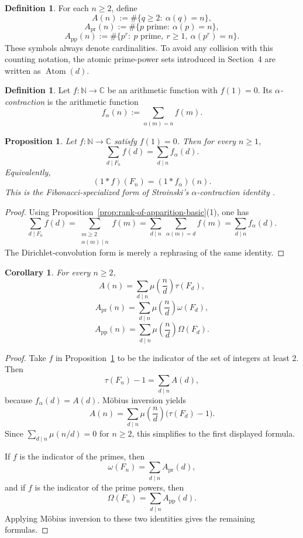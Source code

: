 \documentclass[11pt,letterpaper]{article}
\numberwithin{equation}{section}
\theoremstyle{plain}
\newtheorem{proposition}[theorem]{Proposition}
\newtheorem{corollary}[theorem]{Corollary}
\theoremstyle{definition}
\newtheorem{definition}[theorem]{Definition}
\theoremstyle{remark}
\newcommand{\NN}{\mathbb{N}}
\DeclareMathOperator{\Atom}{Atom}
\begin{document}
\begin{definition}
\label{def:birth-spectra}
For each $n\ge 2$, define
\[
A(n):=\#\{q\ge 2:\ \alpha(q)=n\},
\]
\[
A_{\mathrm{pr}}(n):=\#\{p\text{ prime}:\ \alpha(p)=n\},
\]
\[
A_{\mathrm{pp}}(n):=\#\{p^r:\ p\text{ prime},\ r\ge 1,\ \alpha(p^r)=n\}.
\]
These symbols always denote cardinalities. To avoid any collision with this
counting notation, the atomic prime-power sets introduced in Section~4 are
written as $\Atom(d)$.
\end{definition}

\begin{definition}
\label{def:alpha-contraction}
Let $f:\NN\to \mathbb{C}$ be an arithmetic function with $f(1)=0$. Its
\emph{$\alpha$-contraction} is the arithmetic function
\[
f_\alpha(n):=\sum_{\alpha(m)=n} f(m).
\]
\end{definition}

\begin{proposition}
\label{prop:stroinski-alpha-contraction}
Let $f:\NN\to\mathbb{C}$ satisfy $f(1)=0$. Then for every $n\ge 1$,
\[
\sum_{d\mid F_n} f(d)=\sum_{d\mid n} f_\alpha(d).
\]
Equivalently,
\[
(1*f)(F_n)=(1*f_\alpha)(n).
\]
This is the Fibonacci-specialized form of Stroinski's $\alpha$-contraction
identity \cite{Stroinski2016AlphaContraction}.
\end{proposition}

\begin{proof}
Using Proposition~\ref{prop:rank-of-apparition-basic}(1), one has
\[
\sum_{d\mid F_n} f(d)
=
\sum_{\substack{m\ge 2\\ \alpha(m)\mid n}} f(m)
=
\sum_{d\mid n}\ \sum_{\alpha(m)=d} f(m)
=
\sum_{d\mid n} f_\alpha(d).
\]
The Dirichlet-convolution form is merely a rephrasing of the same identity.
\end{proof}

\begin{corollary}
\label{thm:birth-spectrum-mobius}
For every $n\ge 2$,
\[
A(n)=\sum_{d\mid n}\mu\!\left(\frac{n}{d}\right)\tau(F_d),
\]
\[
A_{\mathrm{pr}}(n)=\sum_{d\mid n}\mu\!\left(\frac{n}{d}\right)\omega(F_d),
\]
\[
A_{\mathrm{pp}}(n)=\sum_{d\mid n}\mu\!\left(\frac{n}{d}\right)\Omega(F_d).
\]
\end{corollary}

\begin{proof}
Take $f$ in Proposition~\ref{prop:stroinski-alpha-contraction} to be the
indicator of the set of integers at least $2$. Then
\[
\tau(F_n)-1=\sum_{d\mid n} A(d),
\]
because $f_\alpha(d)=A(d)$. M\"obius inversion yields
\[
A(n)=\sum_{d\mid n}\mu\!\left(\frac{n}{d}\right)\bigl(\tau(F_d)-1\bigr).
\]
Since $\sum_{d\mid n}\mu(n/d)=0$ for $n\ge 2$, this simplifies to the first
displayed formula.

If $f$ is the indicator of the primes, then
\[
\omega(F_n)=\sum_{d\mid n} A_{\mathrm{pr}}(d),
\]
and if $f$ is the indicator of the prime powers, then
\[
\Omega(F_n)=\sum_{d\mid n} A_{\mathrm{pp}}(d).
\]
Applying M\"obius inversion to these two identities gives the remaining
formulas.
\end{proof}
\end{document}
